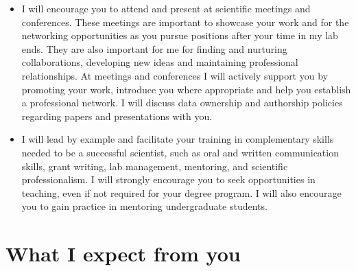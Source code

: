 \documentclass{article}
\begin{document}
\begin{itemize}
	\item I will encourage you to attend and present at scientific meetings and conferences. These meetings are important to showcase your work and for the networking opportunities as you pursue positions after your time in my lab ends. They are also important for me for finding and nurturing collaborations, developing new ideas and maintaining professional relationships. At meetings and conferences I will actively support you by promoting your work, introduce you where appropriate and help you establish a professional network.  I will discuss data ownership and authorship policies regarding papers and presentations with you. 
	\item  I will lead by example and facilitate your training in complementary skills needed to be a
	successful scientist, such as oral and written communication skills, grant writing, lab management,
	mentoring, and scientific professionalism. I will strongly encourage you to seek opportunities
	in teaching, even if not required for your degree program. I will also  encourage you to
	gain practice in mentoring undergraduate students.
\end{itemize}


\section*{What I expect from you} 
\end{document}
